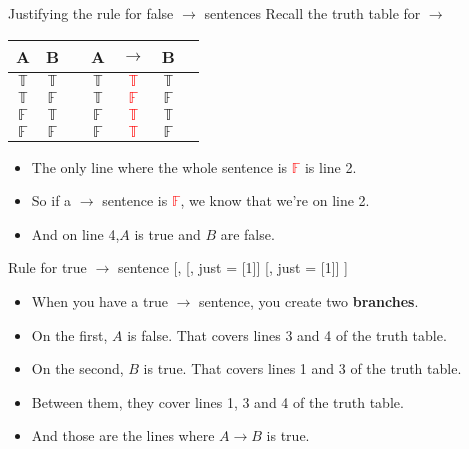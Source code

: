 \documentclass[
  ignorenonframetext,
]{beamer}
\providecommand{\tightlist}{%
  \setlength{\itemsep}{0pt}\setlength{\parskip}{0pt}}
\renewcommand{\,}{\text{, }}
\newenvironment{oltableau}{\center\tableau{}} %
       {\endtableau\endcenter}
\def\True{\mathbb{T}}
\def\False{\mathbb{F}}
\begin{document}
\begin{frame}{Justifying the rule for false \(\rightarrow\) sentences}
\protect\hypertarget{justifying-the-rule-for-false-rightarrow-sentences}{}
Recall the truth table for \(\rightarrow\)

\begin{center}

\begin{tabular}{@{ }c@{ }@{ }c | c@{ }@{ }c@{ }@{ }c@{ }@{ }c@{ }@{ }c}
A & B &  & A & $\rightarrow$ & B & \\
\hline 
$\True$ & $\True$ &  & $\True$ & \textcolor{red}{$\True$} & $\True$ & \\
$\True$ & $\False$ &  & $\True$ & \textcolor{red}{$\False$} & $\False$ & \\
$\False$ & $\True$ &  & $\False$ & \textcolor{red}{$\True$} & $\True$ & \\
$\False$ & $\False$ &  & $\False$ & \textcolor{red}{$\True$} & $\False$ & \\
\end{tabular}

\end{center}

\begin{itemize}
\tightlist
\item
  The only line where the whole sentence is \textcolor{red}{$\False$} is
  line 2.
\item
  So if a \(\rightarrow\) sentence is \textcolor{red}{$\False$}, we know
  that we're on line 2.
\item
  And on line 4,\(A\) is true and \(B\) are false.
\end{itemize}
\end{frame}

\begin{frame}{Rule for true \(\rightarrow\) sentence}
\protect\hypertarget{rule-for-true-rightarrow-sentence}{}
\begin{oltableau}
[\sFmla{\True}{A \rightarrow B}, 
    [\sFmla{\False}{A}, just = {\TRule{\True}{\rightarrow}[1]}]
    [\sFmla{\True}{B}, just = {\TRule{\True}{\rightarrow}[1]}]
]
\end{oltableau}

\begin{itemize}
\tightlist
\item
  When you have a true \(\rightarrow\) sentence, you create two
  \textbf{branches}.
\item
  On the first, \(A\) is false. That covers lines 3 and 4 of the truth
  table.
\item
  On the second, \(B\) is true. That covers lines 1 and 3 of the truth
  table.
\item
  Between them, they cover lines 1, 3 and 4 of the truth table.
\item
  And those are the lines where \(A \rightarrow B\) is true.
\end{itemize}
\end{frame}
\end{document}
